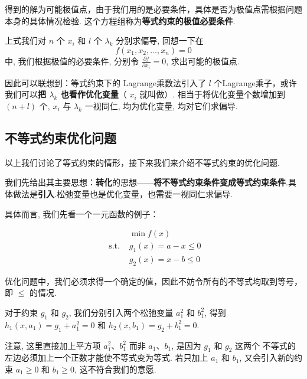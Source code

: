 得到的解为可能极值点，由于我们用的是必要条件，具体是否为极值点需根据问题本身的具体情况检验. 这个方程组称为\textbf{等式约束的极值必要条件}.

上式我们对 $ n $ 个 $ x_{i} $ 和 $ l $ 个 $ \lambda_{k} $ 分别求偏导, 回想一下在 
$$ f\left(x_{1}, x_{2}, \ldots, x_{n}\right)=0 $$ 
中, 我们根据极值的必要条件, 分别令 $ \frac{\partial f}{\partial x_{i}}=0 $, 求出可能的极值点. 

因此可以联想到：等式约束下的 Lagrange乘数法引入了 $ l $ 个Lagrange乘子，或许我们可以\textbf{把 $ \lambda_{k} $ 也看作优化变量}（ $ x_{i} $ 就叫做）. 相当于将优化变量个数增加到 $ (n+l) $ 个, $ x_{i} $ 与 $ \lambda_{k} $ 一视同仁, 均为优化变量, 均对它们求偏导.

\subsection{不等式约束优化问题}

以上我们讨论了等式约束的情形，接下来我们来介绍不等式约束的优化问题.

我们先给出其主要思想：\textbf{转化}的思想——\textbf{将不等式约束条件变成等式约束条件}.具体做法是\textbf{引入}.松弛变量也是优化变量，也需要一视同仁求偏导.

具体而言, 我们先看一个一元函数的例子：

\begin{example}
    $$\begin{aligned}
        &\min f(x)\\
    \text { s.t. }& g_{1}(x)=a-x \leq 0\\
    &g_{2}(x)=x-b \leq 0
    \end{aligned} $$
\end{example}

\begin{remark}
    优化问题中，我们必须求得一个确定的值，因此不妨令所有的不等式均取到等号，即 $ \leq $ 的情况.
\end{remark}


对于约束 $ g_{1} $ 和 $ g_{2} $, 我们分别引入两个松弛变量 $ a_{1}^{2} $ 和 $ b_{1}^{2} $, 得到 $ h_{1}\left(x, a_{1}\right)=g_{1}+a_{1}^{2}=0 $ 和 $ h_{2}\left(x, b_{1}\right)=g_{2}+b_{1}^{2}=0 $. 

\begin{remark}
    注意, 这里直接加上平方项 $ a_{1}^{2} 、 b_{1}^{2} $ 而非 $ a_{1} 、 b_{1} $, 是因为 $ g_{1} $ 和 $ g_{2} $ 这两个 不等式的左边必须加上一个正数才能使不等式变为等式. 若只加上 $ a_{1} $ 和 $ b_{1} $, 又会引入新的约束 $ a_{1} \geq 0 $ 和 $ b_{1} \geq 0 $, 这不符合我们的意愿.
\end{remark}


